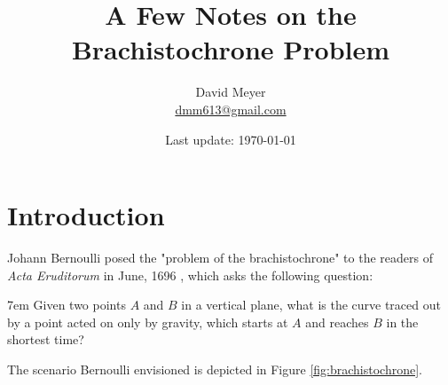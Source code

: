 \documentclass{article}
\title{A Few Notes on the Brachistochrone Problem}
\author{David Meyer \\ \href{mailto:dmm613@gmail.com}
                            {dmm613@gmail.com}}
\date{Last update: \today}
\theoremstyle{definition}
\begin{document}
\maketitle
%
%
%
\section{Introduction}
Johann Bernoulli posed the "problem of the brachistochrone" to the
readers of \emph{Acta Eruditorum} in June, 1696 \cite{1696acta}, 
which asks the following question:

\bigskip 
\begin{addmargin}[2em]{7em}                                                                             %
Given two points $A$ and $B$ in a vertical plane, what is the
curve traced out by a point acted on only by gravity, which
starts at $A$ and reaches $B$ in the shortest time?  
\end{addmargin}


\bigskip
\noindent
The scenario Bernoulli envisioned is depicted in Figure
\ref{fig:brachistochrone}. 
\end{document}
